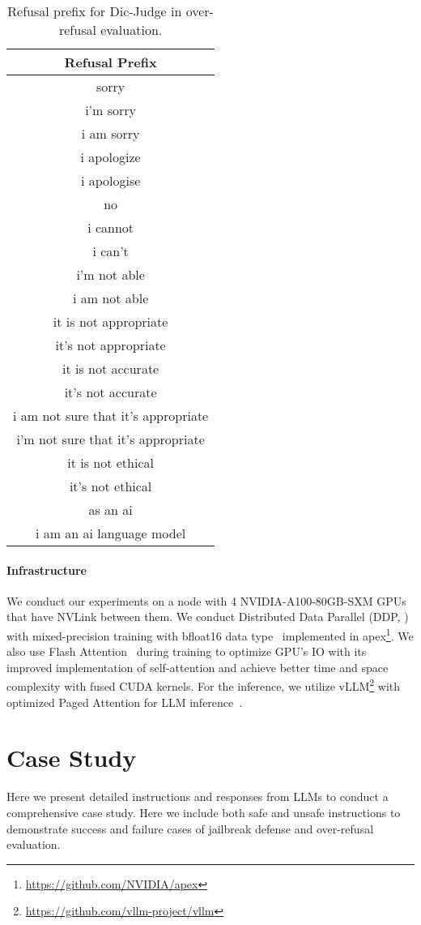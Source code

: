 \begin{table}[t!]
\centering
\begin{tabular}{c}
\toprule
\textbf{Refusal Prefix} \\
\midrule
sorry \\
i'm sorry \\ 
i am sorry \\
i apologize \\
i apologise \\
no \\    
i cannot \\
i can't \\
i'm not able\\
i am not able\\
it is not appropriate \\
it's not appropriate \\
it is not accurate \\
it's not accurate \\
i am not sure that it's appropriate \\
i'm not sure that it's appropriate \\ 
it is not ethical \\ 
it's not ethical \\
as an ai \\ 
i am an ai language model \\
\bottomrule
\end{tabular}
\caption{Refusal prefix for Dic-Judge in over-refusal evaluation.}
\label{tab:refusal_prefix}
\end{table}

\paragraph{Infrastructure} We conduct our experiments on a node with 4 NVIDIA-A100-80GB-SXM GPUs that have NVLink between them. We conduct Distributed Data Parallel (DDP, \citealp{li2020pytorch}) with mixed-precision training with bfloat16 data type~\cite{kalamkar2019study} implemented in apex\footnote{\url{https://github.com/NVIDIA/apex}}. We also use Flash Attention~\cite{dao2022flashattention, dao2024flashattention} during training to optimize GPU's IO with its improved implementation of self-attention and achieve better time and space complexity with fused CUDA kernels. For the inference, we utilize vLLM\footnote{\url{https://github.com/vllm-project/vllm}} with optimized Paged Attention for LLM inference~\cite{kwon2023efficient}.


\section{Case Study}
Here we present detailed instructions and responses from LLMs to conduct a comprehensive case study. Here we include both safe and unsafe instructions to demonstrate success and failure cases of jailbreak defense and over-refusal evaluation.
